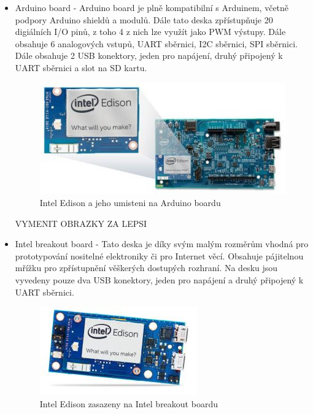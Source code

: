 			\begin{itemize}
				\item Arduino board - Arduino board je plně kompatibilní s Arduinem, včetně podpory Arduino shieldů a modulů. Dále tato deska zpřístupňuje 20 digiálních I/O pinů, z toho 4 z nich lze využít jako PWM výstupy. Dále obsahuje 6 analogových vstupů, UART sběrnici, I2C sběrnici, SPI sběrnici. Dále obsahuje 2 USB konektory, jeden pro napájení, druhý připojený k UART sběrnici a slot na SD kartu.
				\begin{figure}[!h]
  \begin{center}
    \includegraphics[scale=0.8]{obrazky/embed_intel_edison2}
  \end{center}
  \caption{Intel Edison a jeho umisteni na Arduino boardu~\cite{IntelEdison}}
\end{figure}

\colorbox[rgb]{1,0,0}{VYMENIT OBRAZKY ZA LEPSI}

				\item Intel breakout board -  Tato deska je díky svým malým rozměrům vhodná pro prototypování nositelné elektroniky či pro Internet věcí. Obsahuje pájitelnou mřížku pro zpřístupnění věškerých dostupých rozhraní. Na desku jsou vyvedeny pouze dva USB konektory, jeden pro napájení a druhý připojený k UART sběrnici.
				\begin{figure}[!h]
  \begin{center}
    \includegraphics[scale=0.8]{obrazky/embed_intel_edison1}
  \end{center}
  \caption{Intel Edison zasazeny na Intel breakout boardu~\cite{IntelEdison}}
\end{figure}
\end{itemize}

